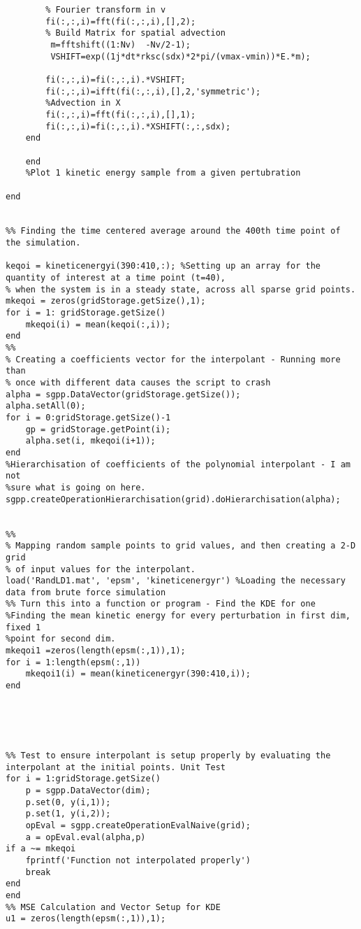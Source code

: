 \documentclass{article}
\begin{document}
\begin{lstlisting}
        % Fourier transform in v
        fi(:,:,i)=fft(fi(:,:,i),[],2);
        % Build Matrix for spatial advection
         m=fftshift((1:Nv)  -Nv/2-1);
         VSHIFT=exp((1j*dt*rksc(sdx)*2*pi/(vmax-vmin))*E.*m);

        fi(:,:,i)=fi(:,:,i).*VSHIFT;
        fi(:,:,i)=ifft(fi(:,:,i),[],2,'symmetric');
        %Advection in X
        fi(:,:,i)=fft(fi(:,:,i),[],1);
        fi(:,:,i)=fi(:,:,i).*XSHIFT(:,:,sdx);
    end
        
    end
    %Plot 1 kinetic energy sample from a given pertubration

end


%% Finding the time centered average around the 400th time point of the simulation.

keqoi = kineticenergyi(390:410,:); %Setting up an array for the quantity of interest at a time point (t=40),
% when the system is in a steady state, across all sparse grid points.
mkeqoi = zeros(gridStorage.getSize(),1);
for i = 1: gridStorage.getSize()
    mkeqoi(i) = mean(keqoi(:,i)); 
end
%%
% Creating a coefficients vector for the interpolant - Running more than
% once with different data causes the script to crash
alpha = sgpp.DataVector(gridStorage.getSize());
alpha.setAll(0);
for i = 0:gridStorage.getSize()-1
    gp = gridStorage.getPoint(i);
    alpha.set(i, mkeqoi(i+1));
end
%Hierarchisation of coefficients of the polynomial interpolant - I am not
%sure what is going on here.
sgpp.createOperationHierarchisation(grid).doHierarchisation(alpha);


%%
% Mapping random sample points to grid values, and then creating a 2-D grid
% of input values for the interpolant.
load('RandLD1.mat', 'epsm', 'kineticenergyr') %Loading the necessary data from brute force simulation
%% Turn this into a function or program - Find the KDE for one
%Finding the mean kinetic energy for every perturbation in first dim, fixed 1
%point for second dim.
mkeqoi1 =zeros(length(epsm(:,1)),1);
for i = 1:length(epsm(:,1))
    mkeqoi1(i) = mean(kineticenergyr(390:410,i));
end





%% Test to ensure interpolant is setup properly by evaluating the interpolant at the initial points. Unit Test
for i = 1:gridStorage.getSize()
    p = sgpp.DataVector(dim);
    p.set(0, y(i,1));
    p.set(1, y(i,2));
    opEval = sgpp.createOperationEvalNaive(grid);
    a = opEval.eval(alpha,p)
if a ~= mkeqoi
    fprintf('Function not interpolated properly')
    break 
end
end
%% MSE Calculation and Vector Setup for KDE
u1 = zeros(length(epsm(:,1)),1);


\end{lstlisting}
\end{document}

